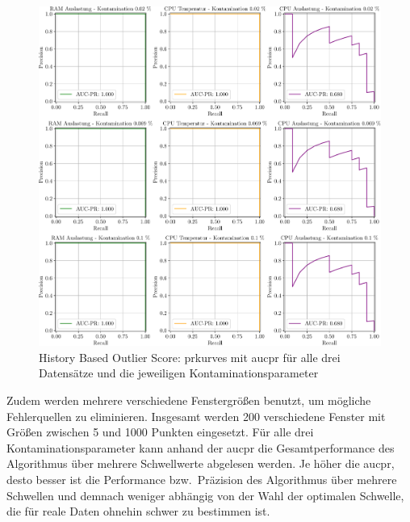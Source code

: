 \begin{figure}[t!]
    \centering
        \includegraphics[width=1\linewidth]{ch5_anomalieerkennung/abbildungen/HBOS_AUC_PR.pdf}
    \caption{\centering History Based Outlier Score: \acp{prkurve} mit \acs*{aucpr} für alle drei Datensätze und die jeweiligen Kontaminationsparameter}
    \label{fig:swz_auc_pr}
\end{figure}

Zudem werden mehrere verschiedene Fenstergrößen benutzt, um mögliche Fehlerquellen zu eliminieren. Insgesamt werden 200 verschiedene Fenster
mit Größen zwischen 5 und 1000 Punkten eingesetzt. Für alle drei Kontaminationsparameter kann anhand der \ac{aucpr} die Gesamtperformance des
Algorithmus über mehrere Schwellwerte abgelesen werden. Je höher die \ac{aucpr}, desto besser ist die Performance bzw.~Präzision des Algorithmus
über mehrere Schwellen und demnach weniger abhängig von der Wahl der optimalen Schwelle, die für reale Daten ohnehin schwer zu bestimmen ist.

